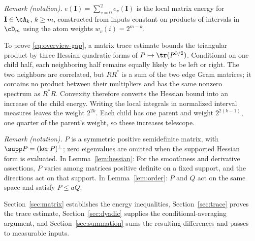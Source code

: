 \noindent\textit{Remark (notation).} $e(\mathbf I)=\sum_{v=0}^2e_v(\mathbf I)$ is the local matrix energy for $\mathbf I\in\cA_k$, $k\ge m$, constructed from inputs constant on products of intervals in $\cD_m$ using the atom weights $w_v(i)=2^{m-k}$.


To prove \eqref{eq:overview-gap}, a matrix trace estimate bounds
the triangular product by three Hessian quadratic forms of
\(P\mapsto\tr(P^{3/2})\). Conditional on one child half, each neighboring
half remains equally likely to be left or right. The two neighbors are
correlated, but \(RR^*\)
is a sum of the two edge Gram matrices; it contains no product between
their multipliers and has the same nonzero spectrum as \(R^*R\).
Convexity therefore converts the Hessian bound into an increase of the
child energy. Writing the local integrals in normalized interval
measures leaves the weight \(2^{2k}\). Each child has one parent and
weight \(2^{2(k-1)}\), one quarter of the parent's weight, so these
increases telescope.

\noindent\textit{Remark (notation).} $P$ is a symmetric positive semidefinite matrix, with $\supp P=(\ker P)^\perp$; zero eigenvalues are omitted when the supported Hessian form is evaluated. In Lemma~\ref{lem:hessian}: For the smoothness and derivative assertions, $P$ varies among matrices positive definite on a fixed support, and the directions act on that support. In Lemma~\ref{lem:order}: $P$ and $Q$ act on the same space and satisfy $P\le aQ$.


Section~\ref{sec:matrix} establishes the energy
inequalities, Section~\ref{sec:trace} proves the trace estimate,
Section~\ref{sec:dyadic} supplies the conditional-averaging argument,
and Section~\ref{sec:summation} sums the resulting differences and
passes to measurable inputs.
